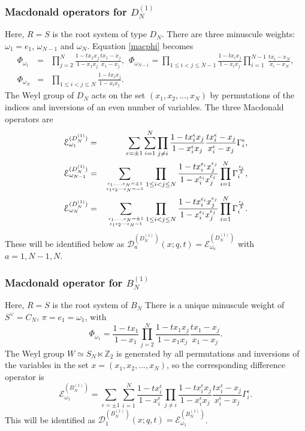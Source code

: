 \documentclass[12pt]{amsart}
\newcommand{\D}{{\mathcal{D}}}
\newcommand{\Z}{{\mathbb Z}}
\numberwithin{equation}{section}
\begin{document}
\subsubsection{Macdonald operators for $D_N^{(1)}$}
\label{DNopsec}
Here, $R=S$ is the root system of type $D_N$. 
%
%
%
%
%
%
%
%
%
%
There are three minuscule weights: $\omega_1=e_1$, $\omega_{N-1}$
and $\omega_N$. 
%
Equation \eqref{macphi} becomes
\begin{eqnarray*}
\Phi_{\omega_1}&=& \prod_{j=2}^N \frac{1-t x_1 x_j}{1-x_1x_j}\frac{tx_1-x_j}{x_1-x_j} ,\ \
\Phi_{\omega_{N-1}}=  \prod_{1\leq i<j\leq N-1} \frac{1-t x_i x_j}{1-x_ix_j} \prod_{i=1}^{N-1}\frac{t x_i-x_N}{x_i-x_N},\\
\Phi_{\omega_N}&=&    \prod_{1\leq i<j\leq N} \frac{1-t x_i x_j}{1-x_ix_j}.
\end{eqnarray*}
The Weyl group of $D_N$ acts on the set $(x_1,x_2,...,x_N)$ by permutations of the indices and 
inversions of an even number of variables. The three Macdonald operators are
\begin{eqnarray}
{\mathcal E}_{\omega_1}^{(D_N^{(1)})}&=&\sum_{\epsilon=\pm 1}\sum_{i=1}^N \prod_{j\neq i} \frac{1-t x_i^\epsilon x_j}{1-x_i^\epsilon x_j}
\frac{t x_i^\epsilon-x_j}{x_i^\epsilon-x_j} \Gamma_i^{\epsilon} ,\label{MD1}\\
{\mathcal E}_{\omega_{N-1}}^{(D_N^{(1)})}&=&  \sum_{\epsilon_1,...,\epsilon_N=\pm 1\atop \epsilon_1\epsilon_2\cdots \epsilon_N=-1}  
\prod_{1\leq i<j\leq N} \frac{1-t x_i^{\epsilon_i} x_j^{\epsilon_j}}{1-x_i^{\epsilon_i}x_j^{\epsilon_j}} 
\prod_{i=1}^N \Gamma_i^{\frac{\epsilon_i}{2}}, \label{MD2}\\
{\mathcal E}_{\omega_N}^{(D_N^{(1)})}&=&  
\sum_{\epsilon_1,...,\epsilon_N=\pm 1\atop \epsilon_1\epsilon_2\cdots \epsilon_N=1}  \prod_{1\leq i<j\leq N} \frac{1-t x_i^{\epsilon_i} x_j^{\epsilon_j}}{1-x_i^{\epsilon_i}x_j^{\epsilon_j}} \prod_{i=1}^N \Gamma_i^{\frac{\epsilon_i}{2}}.\label{MD3}
\end{eqnarray}
These will be identified below as  $\D_a^{(D_N^{(1)})}(x;q,t)={\mathcal E}_{\omega_{a}}^{(D_N^{(1)})}$ with $a=1,N-1,N$.

\subsubsection{Macdonald operator for $B_N^{(1)}$ }
\label{BNopsec}
Here, $R=S$ is the root system of $B_N$
%
%
%
%
%
%
%
%
There is a unique minuscule weight of $S^\vee=C_N$,
$\pi=e_1=\omega_1$, with 
$$\Phi_{\omega_1}=\frac{1-t x_1}{1-x_1}\prod_{j=2}^N \frac{1-t x_1 x_j}{1-x_1x_j}\frac{t x_1-x_j}{x_1-x_j}.
$$
The Weyl group $W\simeq S_N \ltimes \Z_2$ is generated by all permutations and inversions of the variables in the set $x=(x_1,x_2,...,x_N)$, so the corresponding difference operator is
$$
{\mathcal E}_{\omega_1}^{(B_N^{(1)})}=\sum_{\epsilon=\pm 1}
\sum_{i=1}^N \frac{1-t x_i^{\epsilon}}{1-x_i^{\epsilon}}
\prod_{j\neq i} \frac{1-t x_i^{\epsilon} x_j}{1-x_i^{\epsilon}x_j}\frac{t x_i^{\epsilon} -x_j}{x_i^{\epsilon}-x_j}
\Gamma_i^{\epsilon}.
$$
This will be identified as  $\D_1^{(B_N^{(1)})}(x;q,t)={\mathcal E}_{\omega_1}^{(B_N^{(1)})}$.
\end{document}
